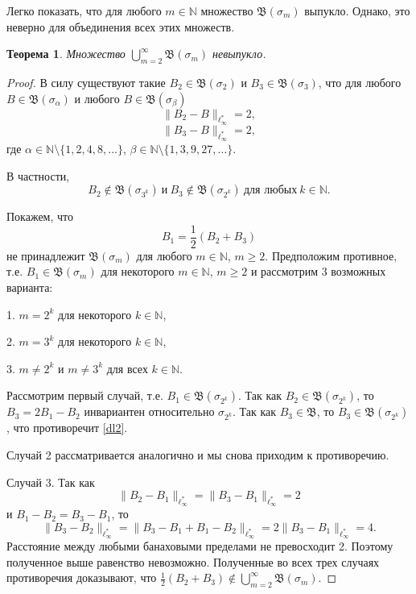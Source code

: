 \documentclass[12pt]{article}
\newtheorem{thm}{Теорема}
\def\N{{\mathbb{N}}}
\begin{document}
Легко показать, что для любого $m\in \N$ множество $\mathfrak B(\sigma_m)$ выпукло. Однако, это неверно для объединения всех этих множеств.

 \begin{thm}
  Множество $\bigcup_{m=2}^\infty\mathfrak B(\sigma_m)$ невыпукло.
 \end{thm}

\begin{proof}
В силу \cite[Теорема 10]{ASSU2} существуют такие $B_2\in \mathfrak B(\sigma_2)$ и $B_3\in \mathfrak B(\sigma_3)$,
что для любого $B\in \mathfrak B(\sigma_\alpha)$ и любого $B\in \mathfrak B(\sigma_\beta)$
\begin{equation}\label{dl1}
\|B_2-B\|_{\ell_\infty^*}=2,
\end{equation}
\begin{equation}\label{dl11}
\|B_3-B\|_{\ell_\infty^*}=2,
\end{equation}
где $\alpha\in \N \setminus \{1,2,4,8,\dots\}$, $\beta\in \N \setminus \{1,3,9,27,\dots\}$.

В частности,
\begin{equation}\label{dl2}
B_2 \notin \mathfrak B(\sigma_{3^k}) \ \text{и} \ B_3 \notin \mathfrak B(\sigma_{2^k}) \ \text{для любых} \ k\in \N.
\end{equation}

Покажем, что
$$B_1 = \frac12(B_2+B_3)$$
не принадлежит $\mathfrak B(\sigma_m)$ для любого $m\in \N$, $m\ge 2$. Предположим противное, т.е. $B_1 \in\mathfrak B(\sigma_m)$ для некоторого $m\in \N$, $m\ge2$ и рассмотрим 3 возможных варианта:

1. $m=2^k$ для некоторого $k\in \N$,

2. $m=3^k$ для некоторого $k\in \N$,

3. $m\neq 2^k$ и $m\neq 3^k$ для всех $k\in \N$.

Рассмотрим первый случай, т.е. $B_1 \in\mathfrak B(\sigma_{2^k})$. Так как $B_2 \in\mathfrak B(\sigma_{2^k})$, то  $B_3=2B_1-B_2$ инвариантен относительно $\sigma_{2^k}$. Так как $B_3 \in\mathfrak B$, то $B_3 \in\mathfrak B(\sigma_{2^k})$, что противоречит \eqref{dl2}.

Случай 2 рассматривается аналогично и мы снова приходим к противоречию.

Случай 3. Так как
$$\|B_2-B_1\|_{\ell_\infty^*}=\|B_3-B_1\|_{\ell_\infty^*}=2$$
и $B_1-B_2=B_3-B_1$, то
$$\|B_3-B_2\|_{\ell_\infty^*}=\|B_3-B_1+B_1-B_2\|_{\ell_\infty^*}=2\|B_3-B_1\|_{\ell_\infty^*}=4.$$
Расстояние между любыми банаховыми пределами не превосходит 2. Поэтому полученное выше равенство невозможно. Полученные во всех трех случаях противоречия доказывают, что $\frac12(B_2+B_3)\notin \bigcup_{m=2}^\infty\mathfrak B(\sigma_m)$.
\end{proof}
\end{document}
